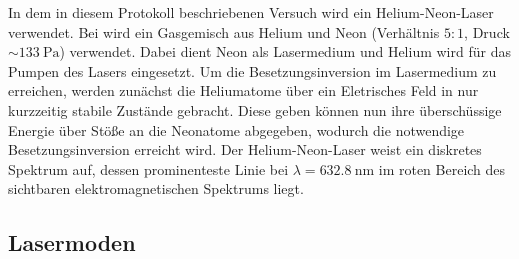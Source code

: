 In dem in diesem Protokoll beschriebenen
Versuch wird ein Helium-Neon-Laser verwendet.
Bei wird ein Gasgemisch aus Helium und
Neon (Verhältnis $5:1$, Druck $\sim \SI{133}{\pascal}$) verwendet.
Dabei dient Neon als Lasermedium und Helium wird für das Pumpen
des Lasers eingesetzt. Um die Besetzungsinversion im Lasermedium
zu erreichen, werden zunächst die Heliumatome über ein
Eletrisches Feld in nur kurzzeitig stabile Zustände gebracht.
Diese geben können nun ihre
überschüssige Energie über Stöße an die Neonatome abgegeben,
wodurch die notwendige Besetzungsinversion erreicht wird.
Der Helium-Neon-Laser weist ein diskretes Spektrum auf, dessen
prominenteste Linie bei $\lambda = \SI{632.8}{\nano\meter}$ im
roten Bereich des sichtbaren elektromagnetischen Spektrums liegt.






\subsection{Lasermoden}
\label{subsec:lasermoden}
